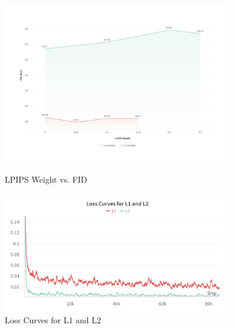 \documentclass[conference]{IEEEtran}
\begin{document}
\begin{figure}[H]
    \begin{minipage}{0.50\textwidth}
    \centering
        \includegraphics[width=0.9\textwidth]{figures/lpips.png}
    \caption{LPIPS Weight vs. FID} \label{fig:lpips}
    \end{minipage}
    \begin{minipage}{0.50\textwidth}
        \includegraphics[width=0.9\textwidth]{figures/loss_curve.png}
    \caption{Loss Curves for L1 and L2} \label{fig:loss_l1l2}
    \end{minipage}
\end{figure} \FloatBarrier
\end{document}
